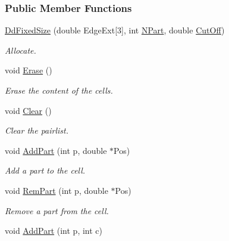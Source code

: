 \subsubsection*{\-Public \-Member \-Functions}
\begin{DoxyCompactItemize}
\item 
\hyperlink{classDdFixedSize_a3b9cc956e6f916c8eb675870cf403b3a}{\-Dd\-Fixed\-Size} (double \-Edge\-Ext\mbox{[}3\mbox{]}, int \hyperlink{classDomDecBasics_abdcc792391d8c5092471dff191de47f4}{\-N\-Part}, double \hyperlink{classDomDecBasics_af2411aba2dd63fa22b1bc279653ff7a0}{\-Cut\-Off})
\begin{DoxyCompactList}\small\item\em \-Allocate. \end{DoxyCompactList}\item 
void \hyperlink{classDdFixedSize_a98ae2e78109ea826eea71da14c37ce95}{\-Erase} ()
\begin{DoxyCompactList}\small\item\em \-Erase the content of the cells. \end{DoxyCompactList}\item 
\hypertarget{classDdFixedSize_aa71d36872f416feaa853788a7a7a7ef8}{void \hyperlink{classDdFixedSize_aa71d36872f416feaa853788a7a7a7ef8}{\-Clear} ()}\label{classDdFixedSize_aa71d36872f416feaa853788a7a7a7ef8}

\begin{DoxyCompactList}\small\item\em \-Clear the pairlist. \end{DoxyCompactList}\item 
\hypertarget{classDdFixedSize_a16bd930c99f12ce47277234de23650ca}{void \hyperlink{classDdFixedSize_a16bd930c99f12ce47277234de23650ca}{\-Add\-Part} (int p, double $\ast$\-Pos)}\label{classDdFixedSize_a16bd930c99f12ce47277234de23650ca}

\begin{DoxyCompactList}\small\item\em \-Add a part to the cell. \end{DoxyCompactList}\item 
\hypertarget{classDdFixedSize_aa81dd095eb9134882b33685338bec68c}{void \hyperlink{classDdFixedSize_aa81dd095eb9134882b33685338bec68c}{\-Rem\-Part} (int p, double $\ast$\-Pos)}\label{classDdFixedSize_aa81dd095eb9134882b33685338bec68c}

\begin{DoxyCompactList}\small\item\em \-Remove a part from the cell. \end{DoxyCompactList}\item 
\hypertarget{classDdFixedSize_a9e2dba5688a67c185c133e7191e596b3}{void \hyperlink{classDdFixedSize_a9e2dba5688a67c185c133e7191e596b3}{\-Add\-Part} (int p, int c)}\label{classDdFixedSize_a9e2dba5688a67c185c133e7191e596b3}


\end{DoxyCompactItemize}
